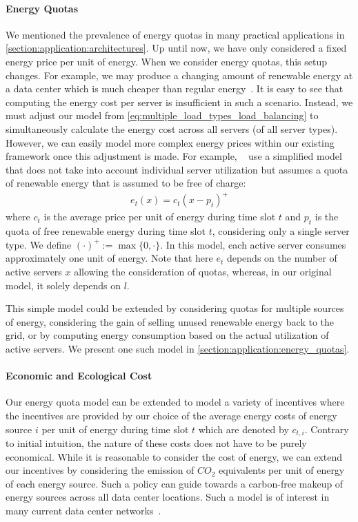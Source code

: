 \paragraph{Energy Quotas} We mentioned the prevalence of energy quotas in many practical applications in \cref{section:application:architectures}. Up until now, we have only considered a fixed energy price per unit of energy. When we consider energy quotas, this setup changes. For example, we may produce a changing amount of renewable energy at a data center which is much cheaper than regular energy~\cite{Lin2012}. It is easy to see that computing the energy cost per server is insufficient in such a scenario. Instead, we must adjust our model from \cref{eq:multiple_load_types_load_balancing} to simultaneously calculate the energy cost across all servers (of all server types). However, we can easily model more complex energy prices within our existing framework once this adjustment is made. For example, \citeauthor{Lin2012}~\cite{Lin2012} use a simplified model that does not take into account individual server utilization but assumes a quota of renewable energy that is assumed to be free of charge: \begin{align*}
    e_t(x) = c_{t}(x - p_t)^+
\end{align*} where $c_t$ is the average price per unit of energy during time slot $t$ and $p_t$ is the quota of free renewable energy during time slot $t$, considering only a single server type. We define $(\cdot)^+ := \max \{0, \cdot\}$. In this model, each active server consumes approximately one unit of energy. Note that here $e_t$ depends on the number of active servers $x$ allowing the consideration of quotas, whereas, in our original model, it solely depends on $l$.

This simple model could be extended by considering quotas for multiple sources of energy, considering the gain of selling unused renewable energy back to the grid, or by computing energy consumption based on the actual utilization of active servers. We present one such model in \cref{section:application:energy_quotas}.

\paragraph{Economic and Ecological Cost} Our energy quota model can be extended to model a variety of incentives where the incentives are provided by our choice of the average energy costs of energy source $i$ per unit of energy during time slot $t$ which are denoted by $c_{t,i}$. Contrary to initial intuition, the nature of these costs does not have to be purely economical. While it is reasonable to consider the cost of energy, we can extend our incentives by considering the emission of $CO_2$ equivalents per unit of energy of each energy source. Such a policy can guide towards a carbon-free makeup of energy sources across all data center locations. Such a model is of interest in many current data center networks~\cite{Hoelzle2020, Miller2021}.

